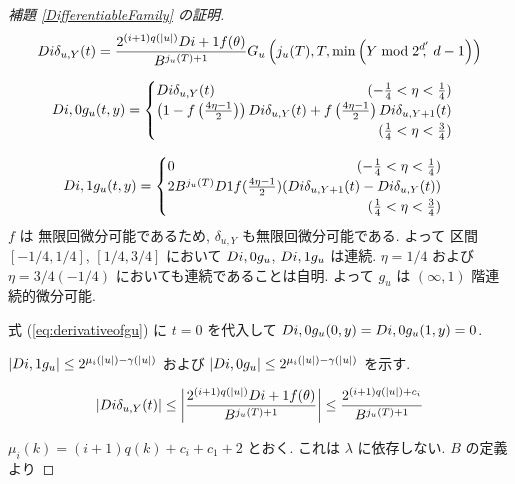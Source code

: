 \begin{proof}[\rm 補題 \ref{DifferentiableFamily} の証明]
  \begin{equation}
   D{i}\delta_{u,Y}(t) 
    = \frac{2^{(i+1)q(|u|)} D{i+1}f(\theta)}{B^{j_u(T)+1}}
    G_u\left( j_u(T), T, \min \left(Y \bmod 2^{d'}\!\!\!,\ d-1 \right) \right)
  \end{equation}

  \begin{equation}
   \label{eq:derivativeofgu}
    \D{i,0} g_u(t, y)
     = \begin{cases}
	\D{i} \delta_{u, Y}(t) 
	\hfill (- \frac 1 4 < \eta < \frac 1 4) \\
	\left( 1-f \left(\frac{4\eta-1}{2}\right)\right) 
	\D{i} \delta_{u, Y}(t) 
	+ f \left(\frac{4\eta-1}{2}\right) \D{i} \delta_{u,Y+1}(t) \\
	\hfill (\frac 1 4 < \eta < \frac 3 4)
       \end{cases}
  \end{equation}   

  \begin{equation}
    \D{i,1} g_u(t, y)
     = \begin{cases}
	0 \hfill (- \frac 1 4 < \eta < \frac 1 4) \\
	2B^{j_u(T)}\D{1}f(\frac{4\eta - 1}2)
	(\D{i}\delta_{u,Y+1}(t)-\D{i}\delta_{u, Y}(t)) \\
	\hfill (\frac 1 4 < \eta < \frac 3 4)
       \end{cases}
  \end{equation}
  $f$ は 無限回微分可能であるため, $\delta_{u,Y}$ も無限回微分可能である.
  よって 区間 $[-1/4, 1/4]$, $[1/4, 3/4]$ において
  $D{i,0} g_u$, $D{i,1} g_u$ は連続. 
  $\eta = 1/4$ および  $\eta = 3/4(-1/4)$ においても連続であることは自明.
  よって $g_u$ は $(\infty, 1)$ 階連続的微分可能.

  式 (\ref{eq:derivativeofgu}) に $t = 0$ を代入して
  $D{i, 0} g_u(0,y) = D{i, 0} g_u(1,y) = 0$.

  $|D{i,1} g_u| \leq 2^{\mu_i (|u|) - \gamma(|u|)}$ および
  $|D{i,0} g_u| \leq 2^{\mu_i (|u|) - \gamma(|u|)}$ を示す.

  \begin{equation}
   |D{i}\delta_{u, Y}(t)| 
    \le \left|\frac{2^{(i+1)q(|u|)}D{i+1}f(\theta)}{B^{j_u(T)+1}} \right|
    \le \frac{2^{(i+1)q(|u|) + c_i}}{B^{j_u(T)+1}}\\
  \end{equation}

  $\mu_i(k) = (i+1)q(k) + c_i + c_1 + 2$ とおく.
  これは $\lambda$ に依存しない.
  $B$ の定義より


\end{proof}
